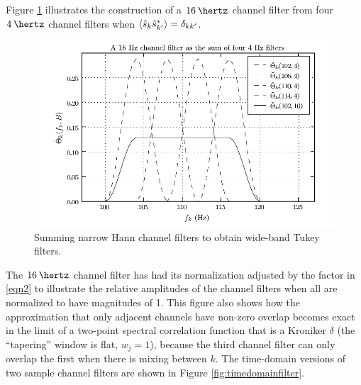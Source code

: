 \documentclass{article}
\begin{document}
Figure \ref{fig:freqdomainfilter} illustrates the construction of a
\(\unit{16}{\hertz}\) channel filter from four \(\unit{4}{\hertz}\) channel
filters when \(\left\langle\hat{s}_{k} \hat{s}^{*}_{k'}\right\rangle = \delta_{k k'}\).
\begin{figure}
\begin{center}
\includegraphics{figures/freqdomainfilter.pdf}
\end{center}
\caption{Summing narrow Hann channel filters to obtain wide-band Tukey
filters.}
\label{fig:freqdomainfilter}
\end{figure}
The \(\unit{16}{\hertz}\) channel filter has had its normalization adjusted
by the factor in \eqref{eqn2} to illustrate the relative amplitudes of the
channel filters when all are normalized to have magnitudes of 1.  This
figure also shows how the approximation that only adjacent channels have
non-zero overlap becomes exact in the limit of a two-point spectral
correlation function that is a Kroniker \(\delta\) (the ``tapering'' window
is flat, \(w_{j} = 1\)), because the third channel filter can only overlap
the first when there is mixing between \(k\).  The time-domain versions of
two sample channel filters are shown in Figure \ref{fig:timedomainfilter}.
\end{document}
